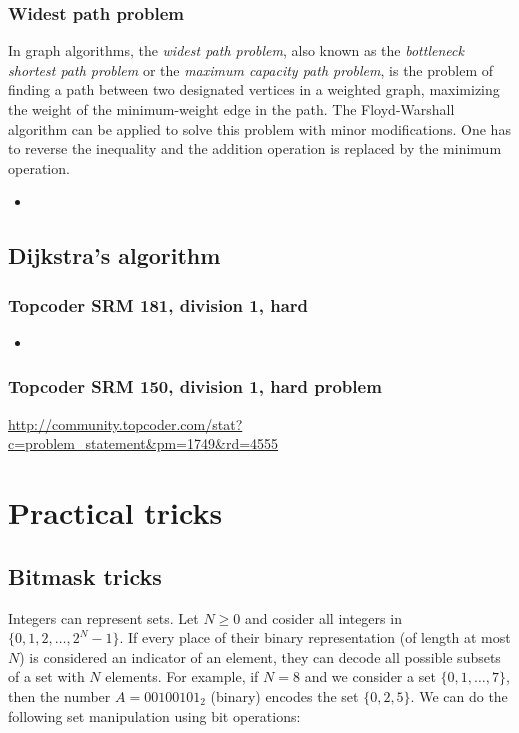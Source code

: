 \documentclass[a4paper, twoside,openany]{book}
\newcommand{\insertcode}[2]{\begin{itemize}\item[]\end{itemize}} %
\begin{document}
\subsection{Widest path problem}
In graph algorithms, the \emph{widest path problem}, also known as the \emph{bottleneck shortest path problem} or the \emph{maximum capacity path problem}, is the problem of finding a path between two designated vertices in a weighted graph, maximizing the weight of the minimum-weight edge in the path.
The Floyd-Warshall algorithm can be applied to solve this problem with minor modifications.
One has to reverse the inequality and the addition operation is replaced by the minimum operation.

\insertcode{"codes/floyd_warshall_routing.cpp"}{A C++ code for the Floyd-Warshall algorithm used for optimal routing in a constrained network.} 


\section{Dijkstra's algorithm}

\subsection{Topcoder SRM 181, division 1, hard}

\insertcode{"codes/Dijkstra_SRM181div1hard.cpp"}{todo}

\subsection{Topcoder SRM 150, division 1, hard problem}

\url{http://community.topcoder.com/stat?c=problem_statement&pm=1749&rd=4555}

\chapter{Practical tricks}

\section{Bitmask tricks}

Integers can represent sets. Let $N \geq 0$ and cosider all integers in $\{ 0, 1, 2, \ldots, 2^N-1 \}$. If every place of their binary representation (of length at most $N$) is considered an indicator of an element, they can decode all possible subsets of a set with $N$ elements. For example, if $N=8$ and we consider a set $\{ 0, 1, \ldots, 7\}$, then the number $A=00100101_2$ (binary) encodes the set $\{ 0, 2, 5 \}$. We can do the following set manipulation using bit operations:
\end{document}
